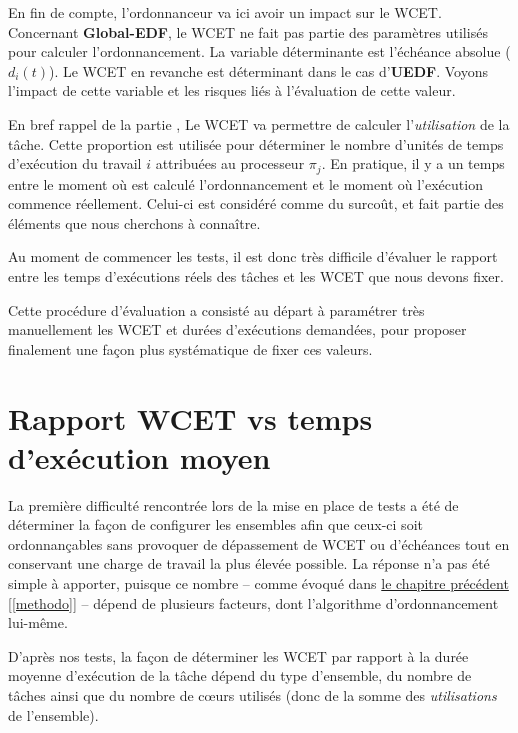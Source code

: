 	En fin de compte, l'ordonnanceur va ici avoir un impact sur le WCET. 
	Concernant \textbf{Global-EDF}, le WCET ne fait pas partie des paramètres utilisés pour calculer 
	l'ordonnancement. La variable déterminante est l'échéance absolue ($d_i(t)$). 
	Le WCET en revanche est déterminant dans le cas d'\textbf{UEDF}. Voyons 
	l'impact de cette variable et les risques liés à l'évaluation de cette valeur.\newline
	
	En bref rappel de la partie , 
	Le WCET va permettre de calculer l'\textit{utilisation} de la tâche. 
	Cette proportion est utilisée pour déterminer le nombre d'unités de temps d'exécution 
	du travail $i$ attribuées au processeur $\pi_j$. \newline
	En pratique, il y a un temps entre le moment où est calculé l'ordonnancement et le 
	moment où l'exécution commence réellement. Celui-ci est considéré comme du surcoût, et 
	fait partie des éléments que nous cherchons à connaître. \newline
	
	Au moment de commencer les tests, il est donc très difficile d'évaluer le rapport 
	entre les temps d'exécutions réels des tâches et les WCET que nous devons fixer. \newline
	
	Cette procédure d'évaluation a consisté au départ à paramétrer très manuellement les WCET et 
	durées d'exécutions demandées, pour proposer finalement une façon plus systématique 
	de fixer ces valeurs.


\section{Rapport WCET vs temps d'exécution moyen}

La première difficulté rencontrée lors de la mise en place de tests a été de déterminer la façon 
de configurer les ensembles afin que ceux-ci soit ordonnançables sans provoquer de 
dépassement de WCET ou d'échéances tout en conservant une charge de travail la plus élevée possible. 
La réponse n'a pas été simple à apporter, puisque ce nombre -- comme 
évoqué dans \hyperref[methodo]{le chapitre précédent} [\ref{methodo}] -- dépend de plusieurs facteurs, dont 
l'algorithme d'ordonnancement lui-même. \newline

D'après nos tests, la façon de déterminer les WCET par rapport à la durée moyenne d'exécution de la tâche 
dépend du type d'ensemble, 
du nombre de tâches ainsi que du nombre de cœurs utilisés (donc de la somme des \textit{utilisations} de l'ensemble).\newline

